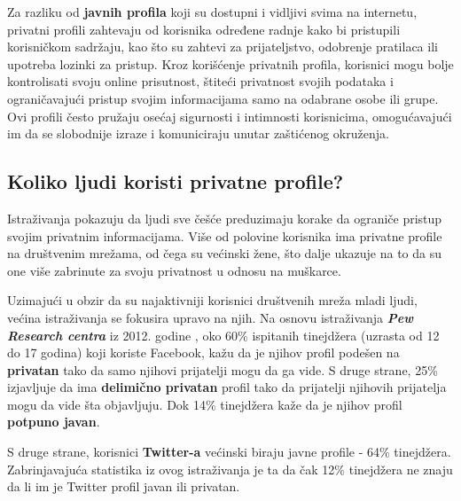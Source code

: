 \documentclass[12pt, a4paper]{article}
\begin{document}
{Za razliku od \textbf{javnih profila} koji su dostupni i vidljivi svima na internetu, privatni profili zahtevaju od korisnika određene radnje kako bi pristupili korisničkom sadržaju, kao što su zahtevi za prijateljstvo, odobrenje pratilaca ili upotreba lozinki za pristup. Kroz korišćenje privatnih profila, korisnici mogu bolje kontrolisati svoju online prisutnost, štiteći privatnost svojih podataka i ograničavajući pristup svojim informacijama samo na odabrane osobe ili grupe. Ovi profili često pružaju osećaj sigurnosti i intimnosti korisnicima, omogućavajući im da se slobodnije izraze i komuniciraju unutar zaštićenog okruženja.

\subsection{Koliko ljudi koristi privatne profile?}

Istraživanja pokazuju da ljudi sve češće preduzimaju korake da ograniče pristup svojim privatnim informacijama. Više od polovine korisnika ima privatne profile na društvenim mrežama, od čega su većinski žene, što dalje ukazuje na to da su one više zabrinute za svoju privatnost u odnosu na muškarce.


Uzimajući u obzir da su najaktivniji korisnici društvenih mreža mladi ljudi, većina istraživanja se fokusira upravo na njih. Na osnovu istraživanja \textit{\textbf{Pew Research centra}} iz 2012. godine \cite{pew2012}, oko 60\% ispitanih tinejdžera (uzrasta od 12 do 17 godina) koji koriste Facebook, kažu da je njihov profil podešen na \textbf{privatan} tako da samo njihovi prijatelji mogu da ga vide. S druge strane, 25\% izjavljuje da ima \textbf{delimično privatan} profil tako da prijatelji njihovih prijatelja mogu da vide šta objavljuju. Dok 14\% tinejdžera kaže da je njihov profil \textbf{potpuno javan}.

S druge strane, korisnici \textbf{Twitter-a} većinski biraju javne profile - 64\% tinejdžera. Zabrinjavajuća statistika iz ovog istraživanja je ta da čak 12\% tinejdžera ne znaju da li im je Twitter profil javan ili privatan.





}
\end{document}

